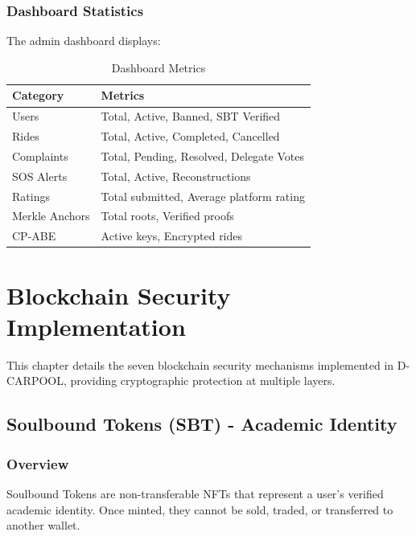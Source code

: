 \documentclass[12pt]{report}
\theoremstyle{plain}
\theoremstyle{definition}
\theoremstyle{remark}
\begin{document}
\subsection{Dashboard Statistics}

The admin dashboard displays:

\begin{table}[H]
\centering
\caption{Dashboard Metrics}
\begin{tabular}{|l|l|}
\hline
\textbf{Category} & \textbf{Metrics} \\
\hline
Users & Total, Active, Banned, SBT Verified \\
Rides & Total, Active, Completed, Cancelled \\
Complaints & Total, Pending, Resolved, Delegate Votes \\
SOS Alerts & Total, Active, Reconstructions \\
Ratings & Total submitted, Average platform rating \\
Merkle Anchors & Total roots, Verified proofs \\
CP-ABE & Active keys, Encrypted rides \\
\hline
\end{tabular}
\end{table}

\chapter{Blockchain Security Implementation}

This chapter details the seven blockchain security mechanisms implemented in D-CARPOOL, providing cryptographic protection at multiple layers.

\section{Soulbound Tokens (SBT) - Academic Identity}

\subsection{Overview}

Soulbound Tokens are non-transferable NFTs that represent a user's verified academic identity. Once minted, they cannot be sold, traded, or transferred to another wallet.
\end{document}
